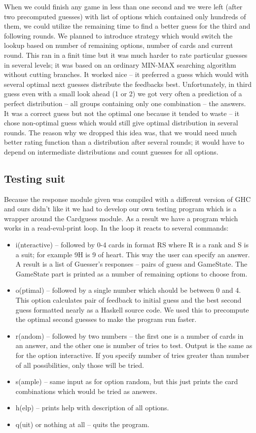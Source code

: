 \documentclass{article}
\begin{document}
When we could finish any game in less than one second and we were left (after two precomputed guesses) with list of options which contained only hundreds of them, we could utilize the remaining time to find a better guess for the third and following rounds.
We planned to introduce strategy which would switch the lookup based on number of remaining options, number of cards and current round.
This ran in a finit time but it was much harder to rate particular guesses in several levels; it was based on an ordinary MIN-MAX searching algorithm without cutting branches.
It worked nice -- it preferred a guess which would with several optimal next guesses distribute the feedbacks best.
Unfortunately, in third guess even with a small look ahead (1 or 2) we got very often a prediction of a perfect distribution -- all groups containing only one combination -- the answers.
It was a correct guess but not the optimal one because it tended to waste -- it chose non-optimal guess which would still give optimal distribution in several rounds.
The reason why we dropped this idea was, that we would need much better rating function than a distribution after several rounds; it would have to depend on intermediate distributions and count guesses for all options.

\subsection{Testing suit}

Because the response module given was compiled with a different version of GHC and ours didn't like it we had to develop our own testing program which is a wrapper around the Cardguess module.
As a result we have a program which works in a read-eval-print loop.
In the loop it reacts to several commands:
\begin{itemize}
\item i(nteractive) -- followed by 0-4 cards in format RS where R is a rank and S is a suit; for example 9H is 9 of heart.
	This way the user can specify an answer.
	A result is a list of Guesser's responses -- pairs of guess and GameState.
	The GameState part is printed as a number of remaining options to choose from.
\item o(ptimal) -- followed by a single number which should be between 0 and 4.
	This option calculates pair of feedback to initial guess and the best second guess formatted nearly as a Haskell source code.
	We used this to precompute the optimal second guesses to make the program run faster.
\item r(andom) -- followed by two numbers -- the first one is a number of cards in an answer, and the other one is number of tries to test.
	Output is the same as for the option interactive.
	If you specify number of tries greater than number of all possibilities, only those will be tried.
\item s(ample) -- same input as for option random, but this just prints the card combinations which would be tried as answers.
\item h(elp) -- prints help with description of all options.
\item q(uit) or nothing at all -- quits the program.
\end{itemize}
\end{document}
